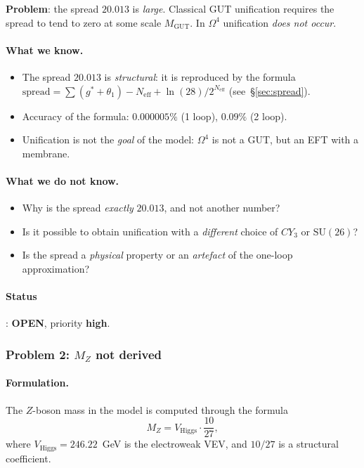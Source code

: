 \documentclass[11pt,a4paper]{article}
\newcommand{\SU}{\ensuremath{\mathrm{SU}}}
\newcommand{\CY}{\ensuremath{CY_3}}
\newcommand{\Om}{\ensuremath{\Omega^4}}
\theoremstyle{definition}
\begin{document}
\medskip\noindent
\textbf{Problem}: the spread $20.013$ is \emph{large}.
Classical GUT unification requires the spread to tend to zero
at some scale $M_{\text{GUT}}$. In $\Om$ unification
\emph{does not occur}.

\paragraph{What we know.}
\begin{itemize}
    \item The spread $20.013$ is \emph{structural}: it
          is reproduced by the formula
          $\text{spread} = \sum(g^*+\theta_1) - N_{\text{eff}}
          + \ln(28)/2^{N_{\text{eff}}}$ (see~\S\ref{sec:spread}).
    \item Accuracy of the formula: $0.000005\%$ (1 loop),
          $0.09\%$ (2 loop).
    \item Unification is not the \emph{goal} of the model:
          $\Om$ is not a GUT, but an EFT with a membrane.
\end{itemize}

\paragraph{What we do not know.}
\begin{itemize}
    \item Why is the spread \emph{exactly} $20.013$, and not
          another number?
    \item Is it possible to obtain unification with a \emph{different}
          choice of $\CY$ or $\SU(26)$?
    \item Is the spread a \emph{physical} property
          or an \emph{artefact} of the one-loop approximation?
\end{itemize}

\paragraph{Status}: \textbf{OPEN}, priority \textbf{high}.

\subsubsection{Problem 2: \texorpdfstring{$M_Z$}{M\_Z} not derived}

\paragraph{Formulation.}
The $Z$-boson mass in the model is computed through the formula
\begin{equation}
    M_Z = V_{\text{Higgs}} \cdot \frac{10}{27},
    \label{eq:MZ-formula}
\end{equation}
where $V_{\text{Higgs}} = 246.22$~GeV is the electroweak VEV,
and $10/27$ is a structural coefficient.
\end{document}
